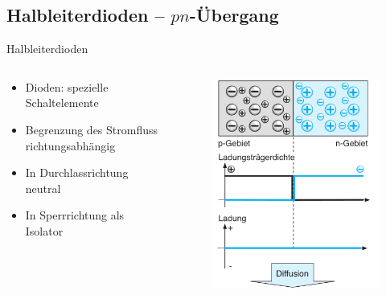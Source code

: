 \documentclass[12pt%
,aspectratio=169%
]{beamer}
\begin{document}
\subsection{Halbleiterdioden -- $pn$-Übergang}
\begin{frame}{Halbleiterdioden}
\begin{columns}[T] %
\begin{column}{.48\textwidth}
\begin{itemize}
	\item Dioden: spezielle Schaltelemente
	\item Begrenzung des Stromﬂuss richtungsabhängig
	\item In Durchlassrichtung neutral
	\item In Sperrrichtung als Isolator
\end{itemize}
\end{column}%
\hfill%
\begin{column}{.48\textwidth}
\begin{figure}
\center
\includegraphics[scale=0.3]{pictures/halbleiterdiode1}
\end{figure}
\end{column}%
\end{columns}
\end{frame}
\end{document}
